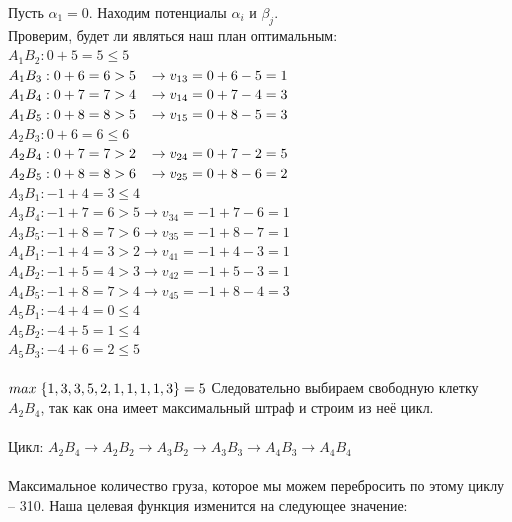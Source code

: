 \documentclass[14pt,a4paper,fleqn]{extarticle}
\begin{document}
Пусть $\alpha_1 = 0$. Находим потенциалы $\alpha_i$ и $\beta_j$.\\
Проверим, будет ли являться наш план оптимальным:\\
$A_1B_2: 0 + 5 = 5 \leq 5$\\
$A_1B_3: 0 + 6= 6 > 5 \hspace*{0.3cm} \rightarrow v_{13} = 0 + 6 - 5 = 1$\\
$A_1B_4: 0 + 7 = 7 > 4 \hspace*{0.3cm} \rightarrow v_{14} = 0 + 7 - 4 = 3$\\
$A_1B_5: 0 + 8 = 8 > 5 \hspace*{0.3cm} \rightarrow v_{15} = 0 + 8 - 5 = 3$\\
$A_2B_3: 0 + 6 = 6 \leq 6$\\
$A_2B_4: 0 + 7 = 7 > 2 \hspace*{0.3cm} \rightarrow v_{24} = 0 + 7 - 2 = 5$\\
$A_2B_5: 0 + 8 = 8 > 6 \hspace*{0.3cm} \rightarrow v_{25} = 0 + 8 - 6 = 2$\\
$A_3B_1: -1 + 4 = 3 \leq 4$\\
$A_3B_4: -1 + 7 = 6 > 5 \rightarrow v_{34} = -1 + 7 - 6 = 1$\\
$A_3B_5: -1 + 8 = 7 > 6 \rightarrow v_{35} = -1 + 8 - 7 = 1$\\
$A_4B_1: -1 + 4 = 3 > 2 \rightarrow v_{41} = -1 + 4 - 3 = 1$\\
$A_4B_2: -1 + 5 = 4 > 3 \rightarrow v_{42} = -1 + 5 - 3 = 1$\\
$A_4B_5: -1 + 8 = 7 > 4 \rightarrow v_{45} = -1 + 8 - 4 = 3$\\
$A_5B_1: -4 + 4 = 0 \leq 4$\\
$A_5B_2: -4 + 5 = 1 \leq 4$\\
$A_5B_3: -4 + 6 = 2 \leq 5$\\\\
$max\hspace*{0.1cm}\{1,3,3,5,2,1,1,1,1,3\} = 5$
\newpage
Следовательно выбираем свободную клетку $A_2B_4$, так как она имеет максимальный штраф и строим из неё цикл.\\\\
Цикл: $A_2B_4 \rightarrow A_2B_2 \rightarrow A_3B_2 \rightarrow A_3B_3 \rightarrow A_4B_3 \rightarrow A_4B_4$\\\\
Максимальное количество груза, которое мы можем перебросить по этому циклу -- 310. Наша целевая функция изменится на следующее значение:\\\\
\end{document}
